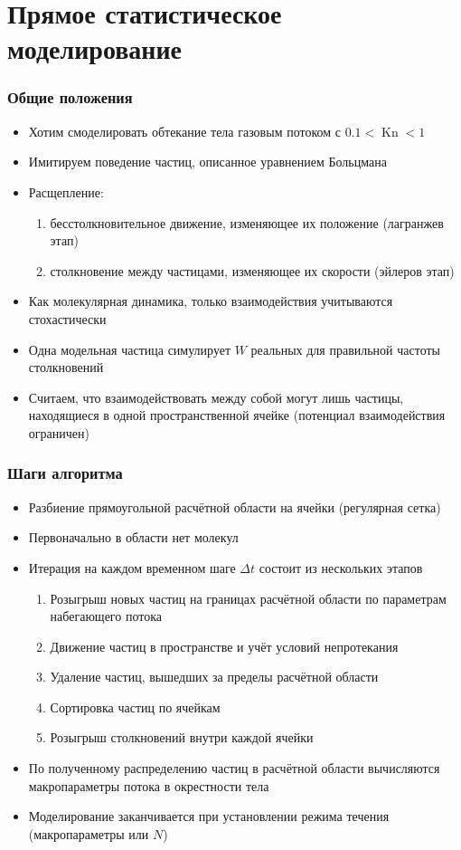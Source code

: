 \documentclass[onlymath]{beamer}
\DeclareMathOperator\Kn{Kn}
\begin{document}
\section{Прямое статистическое моделирование}
\begin{frame}
  \frametitle{Общие положения}
  \begin{itemize}
  \item Хотим смоделировать обтекание тела газовым потоком с $0.1 <
    \Kn < 1$
  \item Имитируем поведение частиц, описанное уравнением Больцмана
  \item Расщепление:
    \begin{enumerate}
      \item бесстолкновительное движение, изменяющее их положение (лагранжев этап)
      \item столкновение между частицами, изменяющее их скорости (эйлеров этап)
    \end{enumerate}
  \item Как молекулярная динамика, только взаимодействия учитываются
    стохастически
  \item Одна модельная частица симулирует $W$ реальных для правильной
    частоты столкновений
  \item Считаем, что взаимодействовать между собой могут лишь частицы,
    находящиеся в одной пространственной ячейке (потенциал
    взаимодействия ограничен)
  \end{itemize}
\end{frame}

\begin{frame}
  \frametitle{Шаги алгоритма}
  \begin{itemize}
  \item Разбиение прямоугольной расчётной области на ячейки (регулярная
    сетка)
  \item Первоначально в области нет молекул
  \item Итерация на каждом временном шаге $\Delta t$ состоит из
    нескольких этапов
    \begin{enumerate}
    \item Розыгрыш новых частиц на границах расчётной области по
      параметрам набегающего потока
    \item Движение частиц в пространстве и учёт условий непротекания
    \item Удаление частиц, вышедших за пределы расчётной области
    \item Сортировка частиц по ячейкам
    \item Розыгрыш столкновений внутри каждой ячейки
    \end{enumerate}
  \item По полученному распределению частиц в расчётной области
    вычисляются макропараметры потока в окрестности тела
  \item Моделирование заканчивается при установлении режима течения
    (макропараметры или $N$)
  \end{itemize}
\end{frame}
\end{document}
